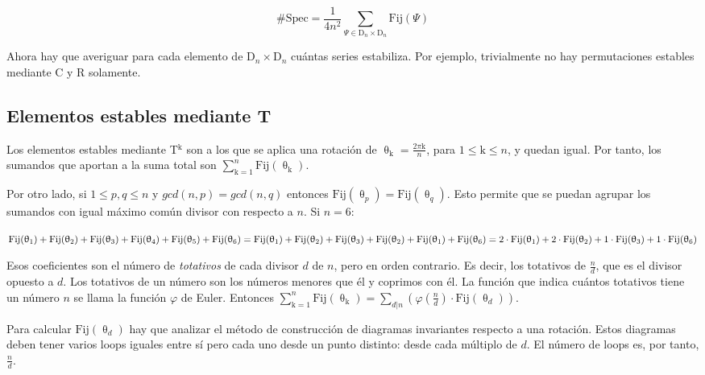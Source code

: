 		\[\#\text{Spec}=\frac{1}{4n^2}\sum_{\Psi\in\text{D}_{n}\times\text{D}_{n}}\text{Fij}(\Psi)\] 
		
		Ahora hay que averiguar para cada elemento de $\text{D}_{n}\times\text{D}_{n}$ cuántas series estabiliza. Por ejemplo, trivialmente no hay permutaciones estables mediante C y R solamente.
		
		\subsection{Elementos estables mediante T}
		
		Los elementos estables mediante T$^\text{k}$ son a los que se aplica una rotación de $\uptheta_\text{k}=\frac{2\pi\text{k}}{n}$, para $1\leq\text{k}\leq n$, y quedan igual. Por tanto, los sumandos que aportan a la suma total son $\sum_{\text{k}=1}^{n}\text{Fij}(\uptheta_\text{k})$.
		
		Por otro lado, si $1\leq p,q\leq n$ y $gcd(n,p)=gcd(n,q)$ entonces $\text{Fij}(\uptheta_p)=\text{Fij}(\uptheta_q)$. Esto permite que se puedan agrupar los sumandos con igual máximo común divisor con respecto a $n$. Si $n=6$: 
		
		$\text{Fij}(\uptheta_\text{1})+\text{Fij}(\uptheta_\text{2})+\text{Fij}(\uptheta_\text{3})+\text{Fij}(\uptheta_\text{4})+\text{Fij}(\uptheta_\text{5})+\text{Fij}(\uptheta_\text{6})=\\%
		\text{Fij}(\uptheta_\text{1})+\text{Fij}(\uptheta_\text{2})+\text{Fij}(\uptheta_\text{3})+\text{Fij}(\uptheta_\text{2})+\text{Fij}(\uptheta_\text{1})+\text{Fij}(\uptheta_\text{6})=\\%
		2\cdot\text{Fij}(\uptheta_\text{1})+2\cdot\text{Fij}(\uptheta_\text{2})+1\cdot\text{Fij}(\uptheta_\text{3})+1\cdot\text{Fij}(\uptheta_\text{6})$
		
		Esos coeficientes son el número de \textit{totativos} de cada divisor $d$ de $n$, pero en orden contrario. Es decir, los totativos de $\frac{n}{d}$, que es el divisor opuesto a $d$. Los totativos de un número son los números menores que él y coprimos con él. La función que indica cuántos totativos tiene un número $n$ se llama la función $\varphi$ de Euler. Entonces $\sum_{\text{k}=1}^{n}\text{Fij}(\uptheta_\text{k})=\sum_{d|n}\left(\varphi(\frac{n}{d})\cdot\text{Fij}(\uptheta_d)\right)$.
		
		Para calcular $\text{Fij}(\uptheta_d)$ hay que analizar el método de construcción de diagramas invariantes respecto a una rotación. Estos diagramas deben tener varios loops iguales entre sí pero cada uno desde un punto distinto: desde cada múltiplo de $d$. El número de loops es, por tanto, $\frac{n}{d}$.
		
